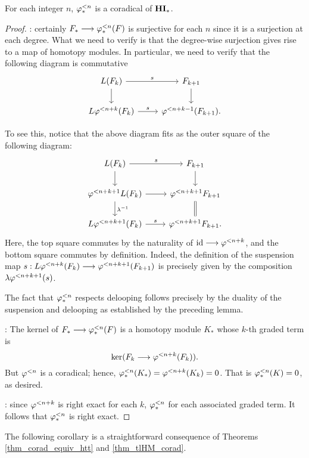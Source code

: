 \begin{thm}\label{thm_tlHM_corad}
For each integer $n$, $\varphi^{< n}_{*}$ is a coradical of $\mathbf{HI}_*$.
\end{thm}

\begin{proof}
 : certainly $F_* \longrightarrow 
\varphi^{< n}_{*}(F)$ is surjective for each $n$ since it is a surjection 
at each degree. What we need to verify is that the degree-wise 
surjection gives rise to a map of homotopy modules. In particular, 
we need to verify that the following diagram is commutative
\[
\begin{tikzcd}
L(F_k) \arrow{r}{\susp} \arrow{d} &
F_{k + 1} \arrow{d} \\
L \tlHI{n + k}(F_k) \arrow{r}{\susp} &
\tlHI{n + k - 1}(F_{k + 1}).
\end{tikzcd}
\]

To see this, notice that the above diagram fits as the outer 
square of the following diagram:
\[
\begin{tikzcd}
L(F_k) \arrow{r}{\susp} \arrow{d} &
F_{k + 1} \arrow{d} \\
\tlHI{n + k + 1} L(F_k) \arrow{r} \arrow{d}{\lambda^{-1}} &
\tlHI{n + k + 1} F_{k + 1} \arrow[equals]{d} \\
L \tlHI{n + k + 1}(F_k) \arrow{r}{\susp} &
\tlHI{n + k + 1} F_{k + 1}.
\end{tikzcd}
\]
Here, the top square commutes by the naturality of $\mathrm{id} \longrightarrow 
\varphi^{< n + k}$, and the bottom square commutes by definition. 
Indeed, the definition of the suspension map 
$s: L \varphi^{< n + k}(F_k) \longrightarrow \varphi^{< n + k + 1}(F_{k + 1})$ is 
precisely given by the composition 
$\lambda \varphi^{< n + k + 1}(s)$.

The fact that $\varphi^{< n}_{*}$ respects delooping follows precisely by
the duality of the suspension and delooping as established by the
preceding lemma.

 : The kernel of $F_* \longrightarrow 
\varphi^{< n}_{*}(F)$ is a homotopy module $K_*$ whose $k$-th graded term is 
\[
\mathrm{ker}(F_k \longrightarrow \varphi^{< n + k}(F_k)). 
\]
But $\varphi^{< n}$ is a coradical; hence, $\varphi^{< n}_{*}(K_*) = 
\varphi^{< n + k}(K_k) = 0$. That is $\varphi^{< n}_{*}(K) = 0$, as desired.

 : since $\varphi^{< n + k}$ is 
right exact for each $k$, $\varphi^{< n}_{*}$ for each associated graded 
term. It follows that $\varphi^{< n}_{*}$ is right exact.
\end{proof}

The following corollary is a straightforward consequence of 
Theorems \ref{thm_corad_equiv_htt} and \ref{thm_tlHM_corad}.

